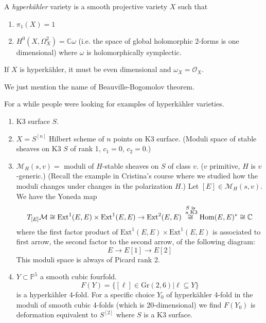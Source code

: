 \begin{definition}
\label{definition-hyperkahler-variety}
A {\it hyperkähler} variety is a smooth projective variety $X$ such that
\begin{enumerate}
\item $\pi_{1}(X)=1$ 
\item $H^{0}(X,\Omega_X^2)=\mathbb{C} \omega$ (i.e. the space of global
holomorphic 2-forms is one dimensional) where $\omega$ is holomorphically
symplectic.
\end{enumerate}
\end{definition}

\begin{remark}
\label{remark-hyperkahler}
If $X$ is hyperkähler, it must be even dimensional and $\omega_X=\mathcal{O}_X$.
\end{remark}

\begin{remark}
\label{remark-Beauville-Bogomolov}
We just mention the name of Beauville-Bogomolov theorem.
\end{remark}

For a while people were looking for examples of hyperkähler varieties.

\begin{example}
\label{example-hyperkahler}
\begin{enumerate}
\item K3 surface $S$.
\item $X=S^{[n]}$ Hilbert scheme of $n$ points on K3 surface. (Moduli space of
stable sheaves on K3 $S$ of rank 1,  $c_1=0$, $c_2=0$.)
\item $\mathcal{M}_H(s,v)=$ moduli of $H$-stable sheaves on $S$ of class $v$.
($v$ primitive, $H$ is $v$-generic.) (Recall the example in Cristina's course
where we studied how the moduli changes under changes in the polarization $H$.)
Let $[E] \in \mathcal{M}_H(s,v)$. We have the Yoneda map
 $$
T_{[E]}\mathcal{M}\cong \text{Ext}^1(E,E)\times \text{Ext}^1(E,E)
\to \text{Ext}^2(E,E)\overset{\substack{S \text{ is}\\\text{ a K3}}}{\cong}\mathop{\mathrm{Hom}}\nolimits(E,E)^*\cong \mathbb{C}
$$
where the first factor product of $\text{Ext}^1(E,E)\times \text{Ext}^1(E,E)$ is
associated to first arrow, the second factor to the second arrow, of the
following diagram:
$$
E \to E[1] \to E[2]
$$
This moduli space is always of Picard rank 2.
\item $Y \subset \mathbb{P}^5$ a smooth cubic fourfold.
$$
F(Y)=\{[\ell] \in \text{Gr}(2,6)|\ell \subseteq Y\}
$$
is a hyperkähler 4-fold. For a specific choice $Y_0$ of hyperkähler 4-fold in
the moduli of smooth cubic 4-folds (which is 20-dimensional) we find $F(Y_0)$ is
deformation equivalent to $S^{[2]}$ where $S$ is a K3 surface.
\end{enumerate}
\end{example}

